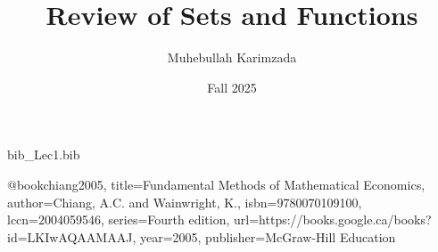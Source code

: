\RequirePackage{filecontents}
\begin{filecontents*}{bib_Lec1.bib}

@book{chiang2005,
  title={Fundamental Methods of Mathematical Economics},
  author={Chiang, A.C. and Wainwright, K.},
  isbn={9780070109100},
  lccn={2004059546},
  series={Fourth edition},
  url={https://books.google.ca/books?id=LKIwAQAAMAAJ},
  year={2005},
  publisher={McGraw-Hill Education}
}
\end{filecontents*}

\documentclass[12pt]{article}
\usepackage{amsmath, amssymb, geometry}
\usepackage[most]{tcolorbox}
\geometry{margin=1in}

\usepackage{amsthm}
\usepackage{tikz}
\usepackage{pgfplots}



\title{Review of Sets and Functions}



\author{Muhebullah Karimzada}
\date{Fall 2025}




\maketitle

\begin{center}
\begin{Large}
\textbf{ECON 320 - Introduction to Mathematical Economics}
\end{Large}
\end{center}
\newpage

\section*{A. Ingredients of a Mathematical Model}
\begin{tcolorbox}[sectionbox]
A mathematical model is a representation of an economic system using variables, equations, and assumptions to describe relationships and predict behavior.
\end{tcolorbox}

